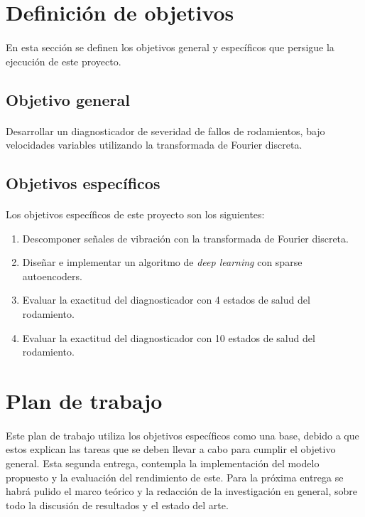 \documentclass[12pt]{article}%
\begin{document}
\newpage
\section{Definición de objetivos}
\paragraph{}
En esta sección se definen los objetivos general y específicos que persigue la ejecución de este proyecto.
\subsection{Objetivo general}
\paragraph{}
Desarrollar un diagnosticador de severidad de fallos de rodamientos, bajo velocidades variables utilizando la transformada de Fourier discreta.

\subsection{Objetivos específicos}
\paragraph{}
Los objetivos específicos de este proyecto son los siguientes:
\begin{enumerate}
\item{Descomponer señales de vibración con la transformada de Fourier discreta.}
\item{Diseñar e implementar un algoritmo de \textit{deep learning} con sparse autoencoders.}
\item{Evaluar la exactitud del diagnosticador con 4 estados de salud del rodamiento.}
\item{Evaluar la exactitud del diagnosticador con 10 estados de salud del rodamiento.}
\end{enumerate}

\section{Plan de trabajo}
\paragraph{}
Este plan de trabajo utiliza los objetivos específicos como una base, debido a que estos explican las tareas que se deben llevar a cabo para cumplir el objetivo general. Esta segunda entrega, contempla la implementación del modelo propuesto y la evaluación del rendimiento de este. Para la próxima entrega se habrá pulido el marco teórico y la redacción de la investigación en general, sobre todo la discusión de resultados y el estado del arte.
\end{document}
